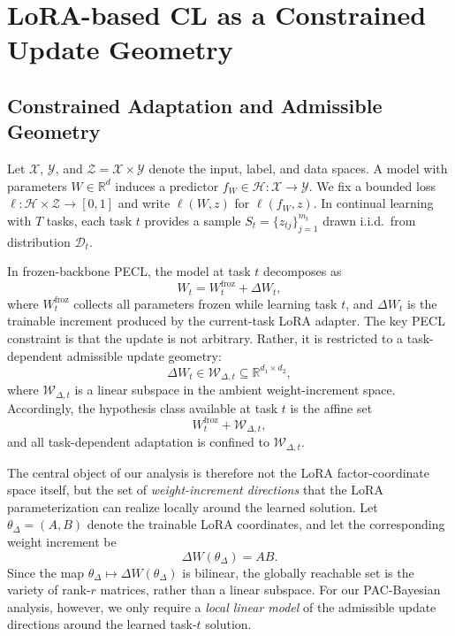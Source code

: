 \documentclass[10pt]{article} %
\begin{document}
\section{LoRA-based CL as a Constrained Update Geometry}
\label{sec:pecl-geometry}


\subsection{ Constrained Adaptation and Admissible Geometry}
\label{sec:decomp-bridge}

Let $\mathcal{X}$, $\mathcal{Y}$, and $\mathcal{Z} = \mathcal{X} \times \mathcal{Y}$ denote the input, label, and data spaces.
A model with parameters $W \in \mathbb{R}^{d}$ induces a predictor $f_W \in \mathcal{H}: \mathcal{X} \to \mathcal{Y} $.
We fix a bounded loss $\ell : \mathcal{H} \times \mathcal{Z} \to [0,1]$ and write $\ell(W,z)$ for $\ell(f_W,z)$.
In continual learning with $T$ tasks, each task $t$ provides a sample $S_t = \{z_{tj}\}_{j=1}^{m_t}$ drawn i.i.d.\ from distribution $\mathcal{D}_t$.

In frozen-backbone PECL, the model at task $t$ decomposes as
\[
W_t = W_t^{\mathrm{froz}} + \Delta W_t,
\]
where $W_t^{\mathrm{froz}}$ collects all parameters frozen while learning task $t$, and $\Delta W_t$ is the trainable increment produced by the current-task LoRA adapter.
The key PECL constraint is that the update is not arbitrary.
Rather, it is restricted to a task-dependent admissible update geometry:
\[
\Delta W_t \in \mathcal{W}_{\Delta,t} \subseteq \mathbb{R}^{d_1 \times d_2},
\]
where $\mathcal{W}_{\Delta,t}$ is a linear subspace in the ambient weight-increment space.
Accordingly, the hypothesis class available at task $t$ is the affine set
\[
W_t^{\mathrm{froz}} + \mathcal{W}_{\Delta,t},
\]
and all task-dependent adaptation is confined to $\mathcal{W}_{\Delta,t}$.

The central object of our analysis is therefore not the LoRA factor-coordinate space itself, but the set of \emph{weight-increment directions} that the LoRA parameterization can realize locally around the learned solution.
Let $\theta_{\Delta} = (A,B)$ denote the trainable LoRA coordinates, and let the corresponding weight increment be
\[
\Delta W(\theta_{\Delta}) = AB.
\]
Since the map $\theta_{\Delta} \mapsto \Delta W(\theta_{\Delta})$ is bilinear, the globally reachable set is the variety of rank-$r$ matrices, rather than a linear subspace.
For our PAC-Bayesian analysis, however, we only require a \emph{local linear model} of the admissible update directions around the learned task-$t$ solution.
\end{document}
